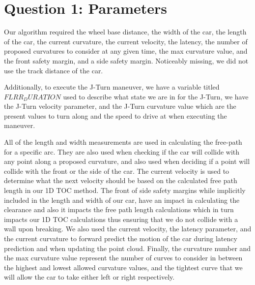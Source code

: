 \section{Question 1: Parameters} 
Our algorithm required the wheel base distance, the width of the car, the length of the car, the current curvature, the current velocity, the latency, the number of proposed curvatures to consider at any given time, the max curvature value, and the front safety margin, and a side safety margin. Noticeably missing, we did not use the track distance of the car. 

Additionally, to execute the J-Turn maneuver, we have a variable titled $FLRR_DURATION$ used to describe what state we are in for the J-Turn, we have the J-Turn velocity parameter, and the J-Turn curvature value which are the present values to turn along and the speed to drive at when executing the maneuver. 

All of the length and width measurements are used in calculating the free-path for a specific arc. They are also used when checking if the car will collide with any point along a proposed curvature, and also used when deciding if a point will collide with the front or the side of the car. The current velocity is used to determine what the next velocity should be based on the calculated free path length in our 1D TOC method. The front of side safety margins while implicitly included in the length and width of our car, have an impact in calculating the clearance and also it impacts the free path length calculations which in turn impacts our 1D TOC calculations thus ensuring that we do not collide with a wall upon breaking. We also used the current velocity, the latency parameter, and the current curvature to forward predict the motion of the car during latency prediction and when updating the point cloud. Finally, the curvature number and the max curvature value represent the number of curves to consider in between the highest and lowest allowed curvature values, and the tightest curve that we will allow the car to take either left or right respectively. 